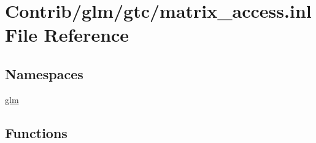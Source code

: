 \hypertarget{matrix__access_8inl}{}\section{Contrib/glm/gtc/matrix\+\_\+access.inl File Reference}
\label{matrix__access_8inl}
\subsection*{Namespaces}
\begin{DoxyCompactItemize}
\item 
 \mbox{\hyperlink{namespaceglm}{glm}}
\end{DoxyCompactItemize}
\subsection*{Functions}
